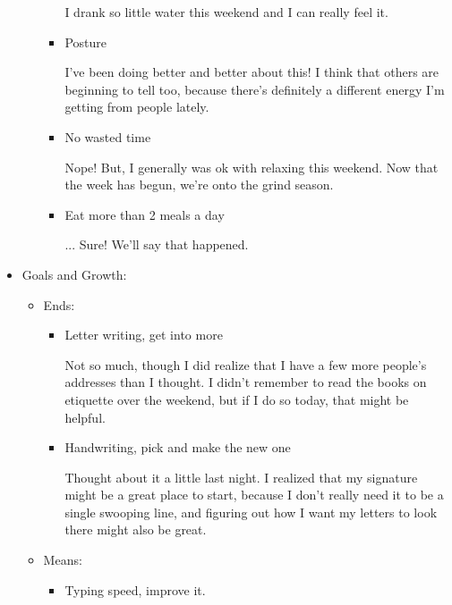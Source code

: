 \documentclass[12pt]{article}
\renewcommand{\,}{\textsuperscript{,}}
\begin{document}
\begin{itemize}
\begin{itemize}
\begin{itemize}
I drank so little water this weekend and I can really feel it.

\item Posture

I've been doing better and better about this! I think that others are beginning to tell too, because there's definitely a different energy I'm getting from people lately.

\item No wasted time

Nope! But, I generally was ok with relaxing this weekend. Now that the week has begun, we're onto the grind season.

\item Eat more than 2 meals a day

... Sure! We'll say that happened.

\end{itemize}

\end{itemize}

\item Goals and Growth:

\begin{itemize}

\item Ends:

\begin{itemize}

\item Letter writing, get into more

Not so much, though I did realize that I have a few more people's addresses than I thought. I didn't remember to read the books on etiquette over the weekend, but if I do so today, that might be helpful.

\item Handwriting, pick and make the new one

Thought about it a little last night.  
I realized that my signature might be a great place to start, because I don't really need it to be a single swooping line, and figuring out how I want my letters to look there might also be great.

\end{itemize}

\item Means:

\begin{itemize}

\item Typing speed, improve it.


\end{itemize}
\end{itemize}
\end{itemize}
\end{document}
